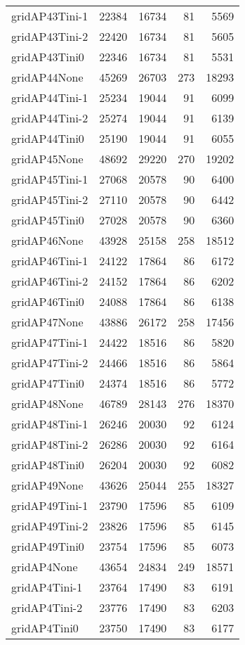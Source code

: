 \begin{longtable}{lrrrr}
gridAP43Tini-1 & 22384 & 16734 & 81 & 5569 \\
gridAP43Tini-2 & 22420 & 16734 & 81 & 5605 \\
gridAP43Tini0 & 22346 & 16734 & 81 & 5531 \\
gridAP44None & 45269 & 26703 & 273 & 18293 \\
gridAP44Tini-1 & 25234 & 19044 & 91 & 6099 \\
gridAP44Tini-2 & 25274 & 19044 & 91 & 6139 \\
gridAP44Tini0 & 25190 & 19044 & 91 & 6055 \\
gridAP45None & 48692 & 29220 & 270 & 19202 \\
gridAP45Tini-1 & 27068 & 20578 & 90 & 6400 \\
gridAP45Tini-2 & 27110 & 20578 & 90 & 6442 \\
gridAP45Tini0 & 27028 & 20578 & 90 & 6360 \\
gridAP46None & 43928 & 25158 & 258 & 18512 \\
gridAP46Tini-1 & 24122 & 17864 & 86 & 6172 \\
gridAP46Tini-2 & 24152 & 17864 & 86 & 6202 \\
gridAP46Tini0 & 24088 & 17864 & 86 & 6138 \\
gridAP47None & 43886 & 26172 & 258 & 17456 \\
gridAP47Tini-1 & 24422 & 18516 & 86 & 5820 \\
gridAP47Tini-2 & 24466 & 18516 & 86 & 5864 \\
gridAP47Tini0 & 24374 & 18516 & 86 & 5772 \\
gridAP48None & 46789 & 28143 & 276 & 18370 \\
gridAP48Tini-1 & 26246 & 20030 & 92 & 6124 \\
gridAP48Tini-2 & 26286 & 20030 & 92 & 6164 \\
gridAP48Tini0 & 26204 & 20030 & 92 & 6082 \\
gridAP49None & 43626 & 25044 & 255 & 18327 \\
gridAP49Tini-1 & 23790 & 17596 & 85 & 6109 \\
gridAP49Tini-2 & 23826 & 17596 & 85 & 6145 \\
gridAP49Tini0 & 23754 & 17596 & 85 & 6073 \\
gridAP4None & 43654 & 24834 & 249 & 18571 \\
gridAP4Tini-1 & 23764 & 17490 & 83 & 6191 \\
gridAP4Tini-2 & 23776 & 17490 & 83 & 6203 \\
gridAP4Tini0 & 23750 & 17490 & 83 & 6177 \\

\end{longtable}
